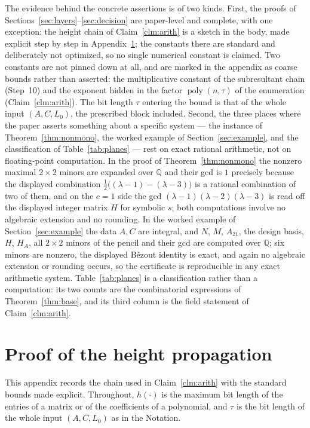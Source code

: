 \documentclass[journal]{IEEEtran}
\theoremstyle{plainn}
\theoremstyle{remark}
\newcommand{\poly}{\operatorname{poly}}
\begin{document}
The evidence behind the concrete assertions is of two kinds. First, the proofs of
Sections~\ref{sec:layers}--\ref{sec:decision} are paper-level and complete, with one exception:
the height chain of Claim~\ref{clm:arith} is a sketch in the body, made explicit step by step in
Appendix~\ref{app:height}; the constants there are standard and deliberately not optimized, so no
single numerical constant is claimed. Two constants are not pinned down at all, and are marked in the
appendix as coarse bounds rather than asserted: the multiplicative constant of the subresultant chain
(Step~10) and the exponent hidden in the factor $\poly(n,\tau)$ of the enumeration
(Claim~\ref{clm:arith}). The bit length $\tau$ entering the bound is that of the whole input
$(A,C,L_0)$, the prescribed block included. Second, the three places where the paper asserts something
about a specific system --- the instance of Theorem~\ref{thm:nonmono}, the worked example of
Section~\ref{sec:example}, and the classification of Table~\ref{tab:planes} --- rest on exact
rational arithmetic, not on floating-point computation. In the proof of Theorem~\ref{thm:nonmono}
the nonzero maximal $2\times2$ minors are expanded over $\mathbb Q$ and their gcd is $1$ precisely
because the displayed combination $\tfrac12\bigl((\lambda-1)-(\lambda-3)\bigr)$ is a rational
combination of two of them, and on the $c=1$ side the gcd $(\lambda-1)(\lambda-2)(\lambda-3)$ is
read off the displayed integer matrix $H$ for symbolic $s$; both computations involve no algebraic
extension and no rounding. In the worked example of Section~\ref{sec:example} the data $A,C$ are
integral, and $N$, $M$, $A_{21}$, the design basis, $H$, $H_A$, all $2\times2$ minors of the pencil
and their gcd are computed over $\mathbb Q$; six minors are nonzero, the displayed Bézout identity
is exact, and again no algebraic extension or rounding occurs, so the certificate is reproducible in
any exact arithmetic system. Table~\ref{tab:planes} is a classification rather than a computation:
its two counts are the combinatorial expressions of Theorem~\ref{thm:base}, and its third column is
the field statement of Claim~\ref{clm:arith}.

\appendices
\small
\section{Proof of the height propagation}\label{app:height}

This appendix records the chain used in Claim~\ref{clm:arith} with the standard bounds made
explicit. Throughout, $h(\cdot)$ is the maximum bit length of the entries of a matrix or of the
coefficients of a polynomial, and $\tau$ is the bit length of the whole input $(A,C,L_0)$ as in the
Notation.
\end{document}
